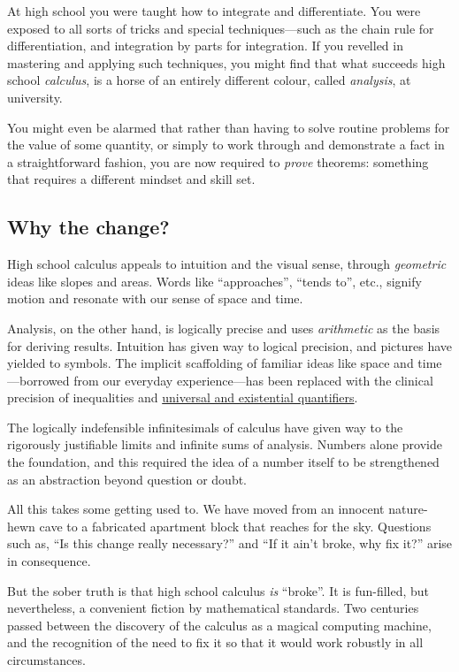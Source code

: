 \documentclass[
  a4paper,
]{article}
\begin{document}
At high school you were taught how to integrate and differentiate. You
were exposed to all sorts of tricks and special techniques---such as the
chain rule for differentiation, and integration by parts for
integration. If you revelled in mastering and applying such techniques,
you might find that what succeeds high school \emph{calculus}, is a
horse of an entirely different colour, called \emph{analysis}, at
university.

You might even be alarmed that rather than having to solve routine
problems for the value of some quantity, or simply to work through and
demonstrate a fact in a straightforward fashion, you are now required to
\emph{prove} theorems: something that requires a different mindset and
skill set.

\subsection{Why the change?}\label{why-the-change}

High school calculus appeals to intuition and the visual sense, through
\emph{geometric} ideas like slopes and areas. Words like ``approaches'',
``tends to'', etc., signify motion and resonate with our sense of space
and time.

Analysis, on the other hand, is logically precise and uses
\emph{arithmetic} as the basis for deriving results. Intuition has given
way to logical precision, and pictures have yielded to symbols. The
implicit scaffolding of familiar ideas like space and time---borrowed
from our everyday experience---has been replaced with the clinical
precision of inequalities and
\href{https://math.libretexts.org/Bookshelves/Mathematical_Logic_and_Proof/Book\%3A_Mathematical_Reasoning__Writing_and_Proof_(Sundstrom)/02\%3A_Logical_Reasoning/2.04\%3A_Quantifiers_and_Negations}{universal
and existential quantifiers}.

The logically indefensible infinitesimals of calculus have given way to
the rigorously justifiable limits and infinite sums of analysis. Numbers
alone provide the foundation, and this required the idea of a number
itself to be strengthened as an abstraction beyond question or doubt.

All this takes some getting used to. We have moved from an innocent
nature-hewn cave to a fabricated apartment block that reaches for the
sky. Questions such as, ``Is this change really necessary?'' and ``If it
ain't broke, why fix it?'' arise in consequence.

But the sober truth is that high school calculus \emph{is} ``broke''. It
is fun-filled, but nevertheless, a convenient fiction by mathematical
standards. Two centuries passed between the discovery of the calculus as
a magical computing machine, and the recognition of the need to fix it
so that it would work robustly in all circumstances.
\end{document}
